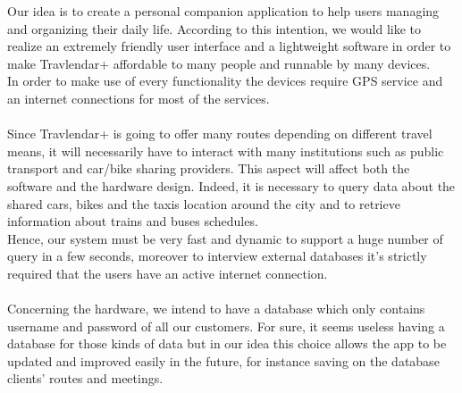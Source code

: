 Our idea is to create a personal companion application to help users managing and organizing their daily life. According to this intention, we would like to realize an extremely friendly user interface and a lightweight software in order to make Travlendar+ affordable to many people and runnable by many devices.\\
In order to make use of every functionality the devices require GPS service and an internet connections for most of the services.\\
\\
Since Travlendar+ is going to offer many routes depending on different travel means, it will necessarily have to interact with many institutions such as public transport and car/bike sharing providers. This aspect will affect both the software and the hardware design. Indeed, it is necessary to query data about the shared cars, bikes and the taxis location around the city and to retrieve information about trains and buses schedules. \\
Hence, our system must be very fast and dynamic to support a huge number of query in a few seconds, moreover to interview external databases it's strictly required that the users have an active internet connection. \\
\\
Concerning the hardware, we intend to have a database which only contains username and password of all our customers. For sure, it seems useless having a database for those kinds of data but in our idea this choice allows the app to be updated and improved easily in the future, for instance saving on the database clients' routes and meetings. \\

